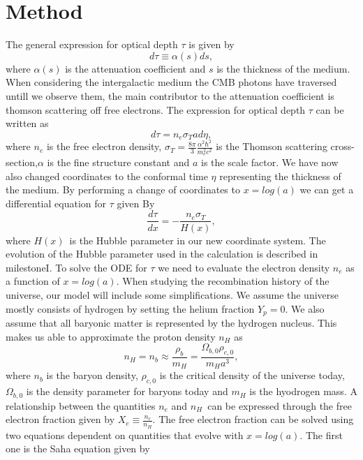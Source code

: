 \documentclass[onecolumn]{aastex62}
\begin{document}
\section{Method} \label{sec:method}
The general expression for optical depth $\tau$ is given by
\begin{equation}
    d\tau\equiv\alpha(s)ds,
\end{equation}
where $\alpha(s)$ is the attenuation coefficient and $s$ is the thickness of the medium. When considering the intergalactic medium the CMB photons have traversed untill we observe them, the main contributor to the attenuation coefficient is thomson scattering off free electrons. The expression for optical depth $\tau$ can be written as
\begin{equation}
    d\tau=n_e\sigma_T ad\eta,
\end{equation}
where $n_e$ is the free electron density, $\sigma_T = \frac{8\pi}{3}\frac{\alpha^2\hbar^2}{m_e^2c^2}$ is the Thomson scattering cross-section,$\alpha$ is the fine structure constant and $a$ is the scale factor. We have now also changed coordinates to the conformal time $\eta$ representing the thickness of the medium. By performing a change of coordinates to $x=log(a)$ we can get a differential equation for $\tau$ given By
\begin{equation}\label{eq:optical_depth_of_x}
    \frac{d\tau}{dx} = -\frac{n_e \sigma_T }{H(x)},
\end{equation}
where $H(x)$ is the Hubble parameter in our new coordinate system. The evolution of the Hubble parameter used in the calculation is described in milestoneI. To solve the ODE for $\tau$ we need to evaluate the electron density $n_e$ as a function of $x=log(a)$. When studying the recombination history of the universe, our model will include some simplifications. We assume the universe mostly consists of hydrogen by setting the helium fraction $Y_p=0$. We also assume that all baryonic matter is represented by the hydrogen nucleus. This makes us able to approximate the proton density $n_H$ as
\begin{equation}
    n_H = n_b \approx \frac{\rho_b}{m_H} = \frac{\Omega_{b,0} \rho_{c,0}}{m_H a^3},
\end{equation}
where $n_b$ is the baryon density, $\rho_{c,0}$ is the critical density of the universe today, $\Omega_{b,0}$ is the density parameter for baryons today and $m_H$ is the hyodrogen mass. A relationship between the quantities $n_e$ and $n_H$ can be expressed through the free electron fraction given by $X_e\equiv\frac{n_e}{n_H}$. The free electron fraction can be solved using two equations dependent on quantities that evolve with $x=log(a)$. The first one is the Saha equation given by
\end{document}
